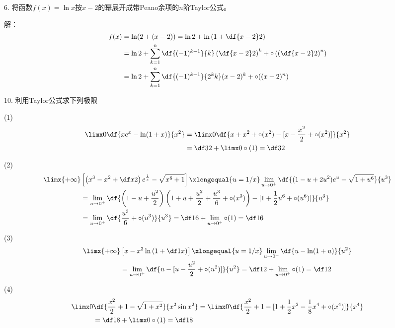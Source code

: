 \bigskip

6. 将函数$f(x)=\ln x$按$x-2$的幂展开成带Peano余项的$n$阶Taylor公式。

解：
\begin{align}
	f(x)&=\ln(2+(x-2))=\ln2+\ln\left(1+\df{x-2}2\right)\notag\\
	&=\ln2+\sum\limits_{k=1}^n\df{(-1)^{k-1}}{k}
	\left(\df{x-2}2\right)^k+\circ\left(\left(\df{x-2}2\right)^n\right)\notag\\
	&=\ln2+\sum\limits_{k=1}^n\df{(-1)^{k-1}}{2^kk}
	(x-2)^k+\circ((x-2)^n)\notag
\end{align}

\bigskip

10. 利用Taylor公式求下列极限

(1)
\begin{align}
	\limx0\df{xe^x-\ln(1+x)}{x^2}
	&=\limx0\df{x+x^2+\circ(x^2)-[x-\frac{x^2}2+\circ(x^2)]}{x^2}\notag\\
	&=\df32+\limx0\circ(1)=\df32\notag
\end{align}

(2)
\begin{align}
	\limx{+\infty}&\left[\left(x^3-x^2+\df x2\right)e^{\frac1x}
	-\sqrt{x^6+1}\right]
	\xlongequal{u=1/x}\lim\limits_{u\to0^+}
	\df{(1-u+2u^2)e^u-\sqrt{1+u^6}}{u^3}\notag\\
	&=\lim\limits_{u\to0^+}\df{\left(1-u+\frac{u^2}2\right)
	\left(1+u+\frac{u^2}2+\frac{u^3}6+\circ(x^3)\right)
	-[1+\frac12u^6+\circ(u^6)]}{u^3}\notag\\
	&=\lim\limits_{u\to0^+}\df{\frac{u^3}6+\circ(u^3)}{u^3}
	=\df16+\lim\limits_{u\to0^+}\circ(1)=\df16\notag
\end{align}

(3)
\begin{align}
	\limx{+\infty}&\left[x-x^2\ln\left(1+\df1x\right)\right]
	\xlongequal{u=1/x}\lim\limits_{u\to0^+}
	\df{u-\ln(1+u)}{u^2}\notag\\
	&=\lim\limits_{u\to0^+}\df{u-[u-\frac{u^2}2+\circ(u^2)]}{u^2}
	=\df12+\lim\limits_{u\to0^+}\circ(1)=\df12\notag
\end{align}

(4)
\begin{align}
	\limx0&\df{\frac{x^2}2+1-\sqrt{1+x^2}}{x^2\sin x^2}
	=\limx0\df{\frac{x^2}2+1-[1+\frac12x^2-\frac18x^4+\circ(x^4)]}{x^4}\notag\\
	&=\df18+\limx0\circ(1)=\df18\notag
\end{align}

\bigskip

